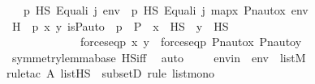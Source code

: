 \begin{isabellebody}
\ \ \ {\isachardoublequoteopen}p\ {\isasymtturnstile}HS\ Equal{\isacharparenleft}{\kern0pt}i{\isacharcomma}{\kern0pt}\ j{\isacharparenright}{\kern0pt}\ env\ {\isasymlongleftrightarrow}\ {\isasympi}{\isacharbackquote}{\kern0pt}p\ {\isasymtturnstile}HS\ Equal{\isacharparenleft}{\kern0pt}i{\isacharcomma}{\kern0pt}\ j{\isacharparenright}{\kern0pt}\ map{\isacharparenleft}{\kern0pt}{\isasymlambda}x{\isachardot}{\kern0pt}\ Pn{\isacharunderscore}{\kern0pt}auto{\isacharparenleft}{\kern0pt}{\isasympi}{\isacharparenright}{\kern0pt}{\isacharbackquote}{\kern0pt}x{\isacharcomma}{\kern0pt}\ env{\isacharparenright}{\kern0pt}{\isachardoublequoteclose}\ \isanewline
%
\isadelimproof
%
\endisadelimproof
%
\isatagproof
{}\isamarkupfalse%
\ {\isacharminus}{\kern0pt}\ \isanewline
\ \ \isamarkupfalse%
\ H{\isacharcolon}{\kern0pt}\ {\isachardoublequoteopen}{\isasymAnd}{\isasympi}\ p\ x\ y{\isachardot}{\kern0pt}\ is{\isacharunderscore}{\kern0pt}P{\isacharunderscore}{\kern0pt}auto{\isacharparenleft}{\kern0pt}{\isasympi}{\isacharparenright}{\kern0pt}\ {\isasymLongrightarrow}\ p\ {\isasymin}\ P\ {\isasymLongrightarrow}\ x\ {\isasymin}\ HS\ {\isasymLongrightarrow}\ y\ {\isasymin}\ HS\ \isanewline
\ \ \ \ \ \ \ \ \ \ \ \ {\isasymLongrightarrow}\ {\isacharparenleft}{\kern0pt}forces{\isacharunderscore}{\kern0pt}eq{\isacharparenleft}{\kern0pt}p{\isacharcomma}{\kern0pt}\ x{\isacharcomma}{\kern0pt}\ y{\isacharparenright}{\kern0pt}\ {\isasymlongleftrightarrow}\ forces{\isacharunderscore}{\kern0pt}eq{\isacharparenleft}{\kern0pt}{\isasympi}{\isacharbackquote}{\kern0pt}p{\isacharcomma}{\kern0pt}\ Pn{\isacharunderscore}{\kern0pt}auto{\isacharparenleft}{\kern0pt}{\isasympi}{\isacharparenright}{\kern0pt}{\isacharbackquote}{\kern0pt}x{\isacharcomma}{\kern0pt}\ Pn{\isacharunderscore}{\kern0pt}auto{\isacharparenleft}{\kern0pt}{\isasympi}{\isacharparenright}{\kern0pt}{\isacharbackquote}{\kern0pt}y{\isacharparenright}{\kern0pt}{\isacharparenright}{\kern0pt}{\isachardoublequoteclose}\ \isanewline
\ \ \ \ \isamarkupfalse%
\ symmetry{\isacharunderscore}{\kern0pt}lemma{\isacharunderscore}{\kern0pt}base\ HS{\isacharunderscore}{\kern0pt}iff\ \isamarkupfalse%
\ auto\ \isanewline
\isanewline
\ \ \isamarkupfalse%
\ envin\ {\isacharcolon}{\kern0pt}\ {\isachardoublequoteopen}env\ {\isasymin}\ list{\isacharparenleft}{\kern0pt}M{\isacharparenright}{\kern0pt}{\isachardoublequoteclose}\ \isanewline
\ \ \ \ \isamarkupfalse%
{\isacharparenleft}{\kern0pt}rule{\isacharunderscore}{\kern0pt}tac\ A{\isacharequal}{\kern0pt}\ {\isachardoublequoteopen}list{\isacharparenleft}{\kern0pt}HS{\isacharparenright}{\kern0pt}{\isachardoublequoteclose}\ \ subsetD{\isacharcomma}{\kern0pt}\ rule\ list{\isacharunderscore}{\kern0pt}mono{\isacharparenright}{\kern0pt}\isanewline

\end{isabellebody}
